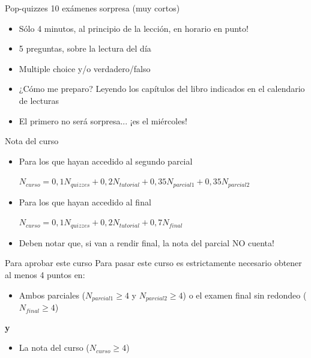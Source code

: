 \documentclass{beamer}
\begin{document}
\begin{frame}{Pop-quizzes}
10 exámenes sorpresa (muy cortos)
    \begin{itemize}
        \item Sólo 4 minutos, al principio de la lección, en horario en punto!
        \item 5 preguntas, sobre la lectura del día
        \item Multiple choice y/o verdadero/falso
        \item ¿Cómo me preparo? Leyendo los capítulos del libro indicados en el calendario de lecturas
        \item El primero no será sorpresa... ¡es el miércoles!
    \end{itemize}
\end{frame}

\begin{frame}{Nota del curso}
    \small
    \begin{itemize}
        \item Para los que hayan accedido al segundo parcial \\
        \begin{center}
            $N_{curso}=0,1N_{quizzes}+0,2N_{tutorial}+0,35N_{parcial 1}+0,35N_{parcial 2}$   
        \end{center}
        \item Para los que hayan accedido al final
        \begin{center}
            $N_{curso}=0,1N_{quizzes}+0,2N_{tutorial}+0,7N_{final}$
        \end{center}
        \item Deben notar que, si van a rendir final, la nota del parcial NO cuenta!
    \end{itemize}
\end{frame}

\begin{frame}{Para aprobar este curso}
    Para pasar este curso es estrictamente necesario obtener al menos 4 puntos en:
    \vspace{2mm}
    \begin{itemize}
        \item Ambos parciales ($N_{parcial 1} \geq 4$ y $N_{parcial 2} \geq 4$) o el examen final sin redondeo ($N_{final} \geq 4$)
    \end{itemize}
    \centering \textbf{y}
    \vspace{2mm}
    \begin{itemize}
        \item La nota del curso ($N_{curso} \geq 4$)
    \end{itemize}
\end{frame}
\end{document}
